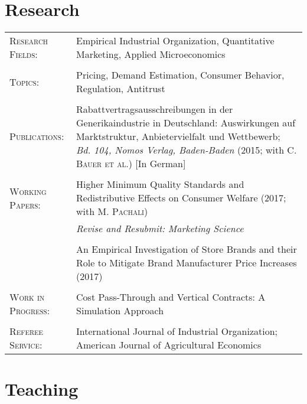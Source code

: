 \documentclass[a4paper,10pt]{article} %
\begin{document}

\section{Research}

\begin{tabular}{P{4.5cm} P{10cm}}
\textsc{Research Fields:} &  Empirical Industrial Organization, Quantitative Marketing, Applied Microeconomics \\
\\
\textsc{Topics:} &  Pricing, Demand Estimation, Consumer Behavior, Regulation, Antitrust \\
\\
\textsc{Publications:} &  Rabattvertragsausschreibungen in der Generikaindustrie in Deutschland: Auswirkungen auf Marktstruktur, Anbietervielfalt und Wettbewerb; \textit{Bd. 104, Nomos Verlag, Baden-Baden} (2015; with C. \textsc{Bauer et al.}) [In German] \\
\\
\textsc{Working Papers:} & Higher Minimum Quality Standards and Redistributive Effects on Consumer Welfare (2017; with M. \textsc{Pachali}) \\
& \textit{Revise and Resubmit: Marketing Science}\\
\\
  & An Empirical Investigation of Store Brands and their Role to Mitigate Brand Manufacturer Price Increases (2017) \\
\\
\textsc{Work in Progress:} &Cost Pass-Through and Vertical Contracts: A Simulation Approach \\
\\
\textsc{Referee Service:}  & International Journal of Industrial Organization; American Journal of Agricultural Economics \\
\end{tabular}


\section{Teaching}
\end{document}

